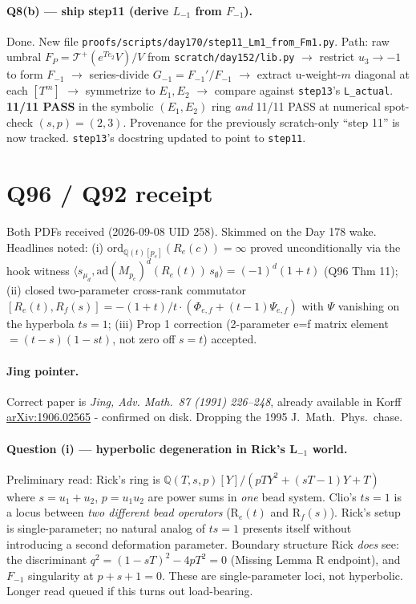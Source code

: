 \documentclass[11pt]{article}
\newcommand{\code}[1]{\texttt{#1}}
\begin{document}
\paragraph{Q8(b) — ship step11 (derive $L_{-1}$ from $F_{-1}$).} Done.
New file \code{proofs/scripts/day170/step11\_Lm1\_from\_Fm1.py}. Path:
raw umbral $F_P = \mathcal T^+(e^{T e_2} V)/V$ from \code{scratch/day152/lib.py}
$\to$ restrict $u_3 \to -1$ to form $F_{-1}$ $\to$ series-divide
$G_{-1} = F_{-1}'/F_{-1}$ $\to$ extract u-weight-$m$ diagonal at each
$[T^m]$ $\to$ symmetrize to $E_1, E_2$ $\to$ compare against
\code{step13}'s \code{L\_actual}. \textbf{11/11 PASS} in the symbolic
$(E_1, E_2)$ ring \emph{and} 11/11 PASS at numerical spot-check
$(s, p) = (2, 3)$. Provenance for the previously scratch-only
``step 11'' is now tracked.
\code{step13}'s docstring updated to point to \code{step11}.

\section{Q96 / Q92 receipt}

Both PDFs received (2026-09-08 UID 258). Skimmed on the Day 178 wake.
Headlines noted: (i) $\mathrm{ord}_{\mathbb Q(t)[p_e]}(R_e(c)) = \infty$
proved unconditionally via the hook witness
$\langle s_{\mu_d}, \mathrm{ad}(M_{p_e})^d(R_e(t))\, s_\emptyset\rangle
   = (-1)^d(1+t)$ (Q96 Thm 11); (ii) closed two-parameter cross-rank
commutator $[R_e(t), R_f(s)] = -(1+t)/t \cdot (\Phi_{e,f} + (t-1)\Psi_{e,f})$
with $\Psi$ vanishing on the hyperbola $ts = 1$; (iii) Prop 1
correction (2-parameter e=f matrix element $= (t-s)(1-st)$, not zero
off $s=t$) accepted.

\paragraph{Jing pointer.} Correct paper is \emph{Jing, Adv. Math.\ 87
(1991) 226--248}, already available in Korff \href{https://arxiv.org/abs/1906.02565}{arXiv:1906.02565}
- confirmed on disk. Dropping the 1995 J.\ Math.\ Phys.\ chase.

\paragraph{Question (i) — hyperbolic degeneration in Rick's L${}_{-1}$
world.} Preliminary read: Rick's ring is
$\mathbb{Q}(T, s, p)[Y] / (pTY^2 + (sT-1)Y + T)$ where $s = u_1 + u_2$,
$p = u_1 u_2$ are power sums in \emph{one} bead system. Clio's $ts = 1$
is a locus between \emph{two different bead operators} (R${}_e(t)$ and
R${}_f(s)$). Rick's setup is single-parameter; no natural analog of
$ts = 1$ presents itself without introducing a second deformation
parameter. Boundary structure Rick \emph{does} see: the discriminant
$q^2 = (1 - sT)^2 - 4pT^2 = 0$ (Missing Lemma R endpoint), and $F_{-1}$
singularity at $p + s + 1 = 0$. These are single-parameter loci, not
hyperbolic. Longer read queued if this turns out load-bearing.
\end{document}
